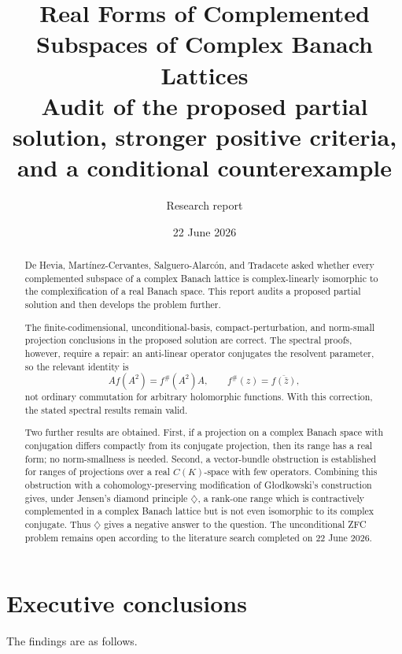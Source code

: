 \documentclass[11pt]{article}
\title{\textbf{Real Forms of Complemented Subspaces of Complex Banach Lattices}\\
\large Audit of the proposed partial solution, stronger positive criteria,\\
and a conditional counterexample}
\author{Research report}
\date{22 June 2026}
\theoremstyle{definition}
\theoremstyle{remark}
\begin{document}
\maketitle

\begin{abstract}
De Hevia, Mart\'inez-Cervantes, Salguero-Alarc\'on, and Tradacete asked whether every complemented subspace of a complex Banach lattice is complex-linearly isomorphic to the complexification of a real Banach space. This report audits a proposed partial solution and then develops the problem further.

The finite-codimensional, unconditional-basis, compact-perturbation, and norm-small projection conclusions in the proposed solution are correct. The spectral proofs, however, require a repair: an anti-linear operator conjugates the resolvent parameter, so the relevant identity is
\[
 A f(A^2)=f^{\#}(A^2)A,\qquad f^{\#}(z)=\overline{f(\bar z)},
\]
not ordinary commutation for arbitrary holomorphic functions. With this correction, the stated spectral results remain valid.

Two further results are obtained. First, if a projection on a complex Banach space with conjugation differs compactly from its conjugate projection, then its range has a real form; no norm-smallness is needed. Second, a vector-bundle obstruction is established for ranges of projections over a real $C(K)$-space with few operators. Combining this obstruction with a cohomology-preserving modification of G\l odkowski's construction gives, under Jensen's diamond principle $\diamondsuit$, a rank-one range which is contractively complemented in a complex Banach lattice but is not even isomorphic to its complex conjugate. Thus $\diamondsuit$ gives a negative answer to the question. The unconditional ZFC problem remains open according to the literature search completed on 22 June 2026.
\end{abstract}

\tableofcontents

\section{Executive conclusions}

The findings are as follows.
\end{document}
